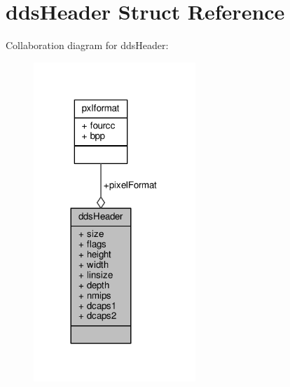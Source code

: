 \hypertarget{structddsHeader}{}\section{dds\+Header Struct Reference}
\label{structddsHeader}


Collaboration diagram for dds\+Header\+:
\nopagebreak
\begin{figure}[H]
\begin{center}
\leavevmode
\includegraphics[width=173pt]{d7/d6e/structddsHeader__coll__graph}
\end{center}
\end{figure}
